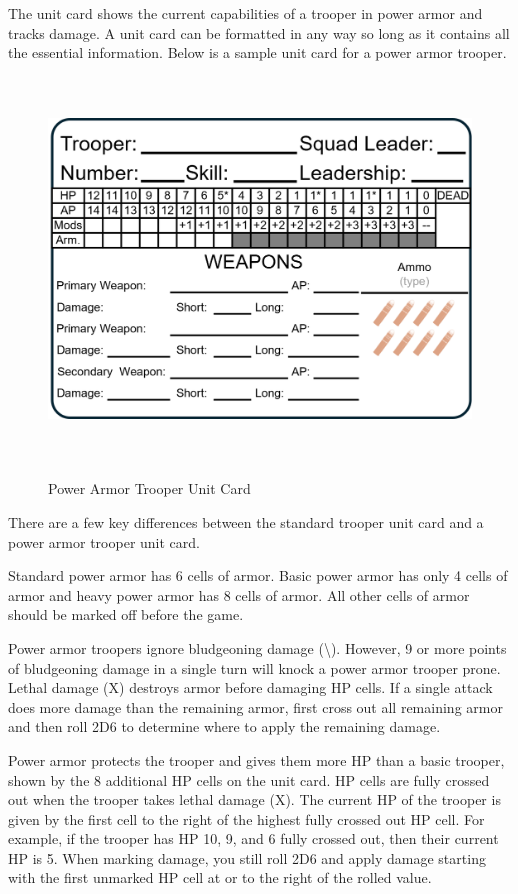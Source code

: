 The unit card shows the current capabilities of a trooper in power armor and tracks damage.
A unit card can be formatted in any way so long as it contains all the essential information.
Below is a sample unit card for a power armor trooper.

\begin{figure}[H]
  \centering
  \includegraphics[alt='Sample Power Armor Trooper', width=5.63in, height=4in]{img/PowerArmorTrooper.png}
  \caption*{Power Armor Trooper Unit Card}
\end{figure}

There are a few key differences between the standard trooper unit card and a power armor trooper unit card.

Standard power armor has 6 cells of armor.
Basic power armor has only 4 cells of armor and heavy power armor has 8 cells of armor.
All other cells of armor should be marked off before the game.

Power armor troopers ignore bludgeoning damage (\textbackslash).
However, 9 or more points of bludgeoning damage in a single turn will knock a power armor trooper prone.
Lethal damage (X) destroys armor before damaging HP cells.
If a single attack does more damage than the remaining armor, first cross out all remaining armor and then roll 2D6 to determine where to apply the remaining damage.

Power armor protects the trooper and gives them more HP than a basic trooper, shown by the 8 additional HP cells on the unit card.
HP cells are fully crossed out when the trooper takes lethal damage (X).
The current HP of the trooper is given by the first cell to the right of the highest fully crossed out HP cell.
For example, if the trooper has HP 10, 9, and 6 fully crossed out, then their current HP is 5.
When marking damage, you still roll 2D6 and apply damage starting with the first unmarked HP cell at or to the right of the rolled value.

